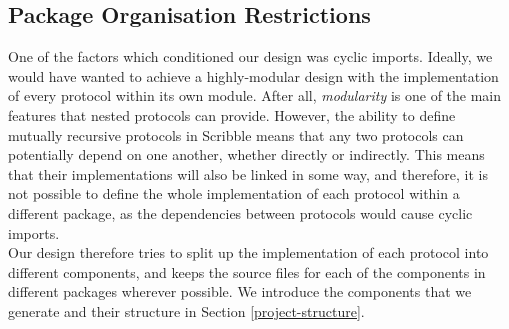 \documentclass[12pt,twoside]{report}
\begin{document}
\subsection{Package Organisation Restrictions}\label{package-organisation-restrictions}

One of the factors which conditioned our design was cyclic imports. Ideally, we would have wanted to achieve a highly-modular design with the implementation of every protocol within its own module. After all, \textit{modularity} is one of the main features that nested protocols can provide. However, the ability to define mutually recursive protocols in Scribble means that any two protocols can potentially depend on one another, whether directly or indirectly. This means that their implementations will also be linked in some way, and therefore, it is not possible to define the whole implementation of each protocol within a different package, as the dependencies between protocols would cause cyclic imports.\\

Our design therefore tries to split up the implementation of each protocol into different components, and keeps the source files for each of the components in different packages wherever possible. We introduce the components that we generate and their structure in Section \ref{project-structure}.






\end{document}
